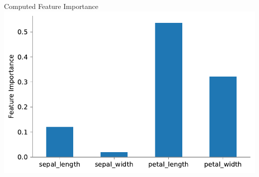\documentclass{beamer}
\begin{document}
\begin{frame}{Computed Feature Importance}
\includegraphics[scale=0.6]{feature-importance.pdf}
\end{frame}

%
\end{document}
